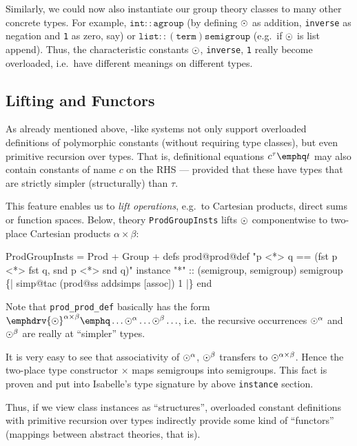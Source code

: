 \begin{ascbox}
\begin{ascbox}
\begin{ascbox}
\begin{ascbox}
\begin{ascbox}
Similarly, we could now also instantiate our group theory classes to
many other concrete types. For example, $\texttt{int} :: \texttt{agroup}$ (by
defining $\odot$ as addition, \texttt{inverse} as negation and \texttt{1} as
zero, say) or $\texttt{list} :: (\texttt{term})\texttt{semigroup}$ (e.g.\ if
$\odot$ is list append). Thus, the characteristic constants $\odot$,
\texttt{inverse}, \texttt{1} really become overloaded, i.e.\ have different
meanings on different types.


\subsection{Lifting and Functors}

As already mentioned above, \HOL-like systems not only support
overloaded definitions of polymorphic constants (without requiring
type classes), but even primitive recursion over types. That is,
definitional equations $c^\tau \emphq t$ may also contain constants of
name $c$ on the RHS --- provided that these have types that are
strictly simpler (structurally) than $\tau$.

This feature enables us to \emph{lift operations}, e.g.\ to Cartesian
products, direct sums or function spaces. Below, theory
\texttt{ProdGroupInsts} lifts $\odot$ componentwise to two-place
Cartesian products $\alpha \times \beta$:

\begin{ascbox}
ProdGroupInsts = Prod + Group +\medskip
defs
  prod@prod@def "p <*> q == (fst p <*> fst q, snd p <*> snd q)"\medskip
instance
  "*" :: (semigroup, semigroup) semigroup
    \{| simp@tac (prod@ss addsimps [assoc]) 1 |\}
end

Note that \texttt{prod_prod_def} basically has the form $\emphdrv
{\TIMES}^{\alpha \times \beta} \emphq \ldots {\TIMES}^\alpha \ldots
{\TIMES}^\beta \ldots$, i.e.\ the recursive occurrences
$\odot^\alpha$ and $\odot^\beta$ are really at ``simpler'' types.

It is very easy to see that associativity of $\odot^\alpha$,
$\odot^\beta$ transfers to ${\odot}^{\alpha \times \beta}$. Hence
the two-place type constructor $\times$ maps semigroups into
semigroups. This fact is proven and put into Isabelle's type signature by
above \texttt{instance} section.

\medskip

Thus, if we view class instances as ``structures'', overloaded
constant definitions with primitive recursion over types indirectly
provide some kind of ``functors'' (mappings between abstract theories,
that is).





\end{ascbox}
\end{ascbox}
\end{ascbox}
\end{ascbox}
\end{ascbox}
\end{ascbox}
